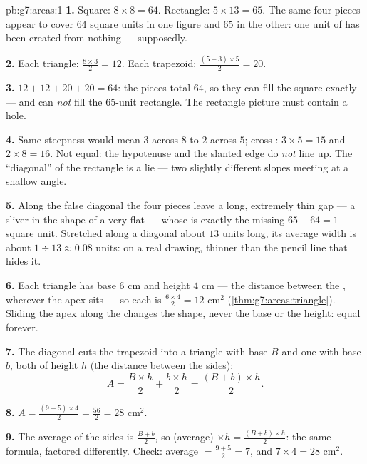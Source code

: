 \begin{solution}{pb:g7:areas:1}
\textbf{1.} Square: $8 \times 8 = 64$. Rectangle:
$5 \times 13 = 65$. The same four pieces appear to cover $64$
square units in one figure and $65$ in the other: one unit of
 has been created from nothing --- supposedly.

\textbf{2.} Each triangle: $\frac{8 \times 3}{2} = 12$. Each
trapezoid: $\frac{(5 + 3) \times 5}{2} = 20$.

\textbf{3.} $12 + 12 + 20 + 20 = 64$: the pieces total $64$,
so they can fill the square exactly --- and can \emph{not} fill
the $65$-unit rectangle. The rectangle picture must contain a
hole.

\textbf{4.} Same steepness would mean $3$ across $8$
 to $2$ across $5$; cross :
$3 \times 5 = 15$ and $2 \times 8 = 16$. Not equal: the
hypotenuse and the slanted edge do \emph{not} line up. The
``diagonal'' of the rectangle is a lie --- two slightly
different slopes meeting at a shallow angle.

\textbf{5.} Along the false diagonal the four pieces leave a
long, extremely thin gap --- a sliver in the shape of a very
flat  --- whose  is exactly the missing
$65 - 64 = 1$ square unit. Stretched along a diagonal about
$13$ units long, its average width is about
$1 \div 13 \approx 0.08$ units: on a real drawing, thinner than
the pencil line that hides it.

\textbf{6.} Each triangle has base $6$ cm and height $4$ cm ---
the distance between the , wherever the apex sits ---
so each  is $\frac{6 \times 4}{2} = 12$ cm$^2$
(\cref{thm:g7:areas:triangle}). Sliding the apex along the
 changes the shape, never the base or the height:
equal  forever.

\textbf{7.} The diagonal cuts the trapezoid into a triangle
with base $B$ and one with base $b$, both of height $h$ (the
distance between the  sides):
\[
A = \frac{B \times h}{2} + \frac{b \times h}{2}
= \frac{(B + b) \times h}{2} .
\]

\textbf{8.} $A = \frac{(9 + 5) \times 4}{2} = \frac{56}{2} =
28$ cm$^2$.

\textbf{9.} The average of the  sides is
$\frac{B + b}{2}$, so (average) $\times h =
\frac{(B+b) \times h}{2}$: the same formula, factored
differently. Check: average $= \frac{9+5}{2} = 7$, and
$7 \times 4 = 28$ cm$^2$.


\end{solution}
